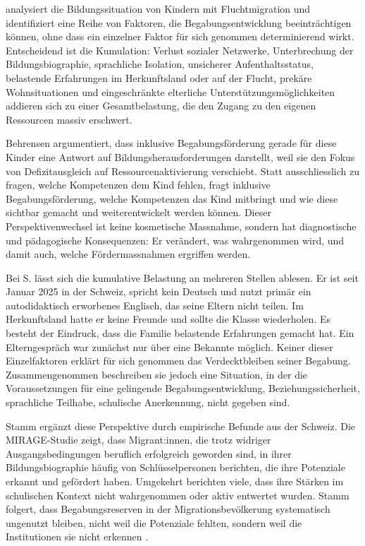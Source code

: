 \documentclass[ngerman, a4paper]{article}
\begin{document}
\textcite{behrensen2019inklusive} analysiert die Bildungssituation von Kindern mit Fluchtmigration und
identifiziert eine Reihe von Faktoren, die Begabungsentwicklung beeinträchtigen können,
ohne dass ein einzelner Faktor für sich genommen determinierend wirkt. Entscheidend
ist die Kumulation: Verlust sozialer Netzwerke, Unterbrechung der Bildungsbiographie,
sprachliche Isolation, unsicherer Aufenthaltsstatus, belastende Erfahrungen im
Herkunftsland oder auf der Flucht, prekäre Wohnsituationen und eingeschränkte
elterliche Unterstützungsmöglichkeiten addieren sich zu einer Gesamtbelastung, die
den Zugang zu den eigenen Ressourcen massiv erschwert.

Behrensen argumentiert, dass inklusive Begabungsförderung gerade für diese Kinder
eine Antwort auf Bildungsherausforderungen darstellt, weil sie den Fokus von
Defizitausgleich auf Ressourcenaktivierung verschiebt. Statt ausschliesslich zu fragen,
welche Kompetenzen dem Kind fehlen, fragt inklusive Begabungsförderung, welche
Kompetenzen das Kind mitbringt und wie diese sichtbar gemacht und weiterentwickelt
werden können. Dieser Perspektivenwechsel ist keine kosmetische Massnahme, sondern
hat diagnostische und pädagogische Konsequenzen: Er verändert, was wahrgenommen wird,
und damit auch, welche Fördermassnahmen ergriffen werden.

Bei S. lässt sich die kumulative Belastung an mehreren Stellen ablesen. Er ist seit
Januar 2025 in der Schweiz, spricht kein Deutsch und nutzt primär ein autodidaktisch
erworbenes Englisch, das seine Eltern nicht teilen. Im Herkunftsland hatte er keine
Freunde und sollte die Klasse wiederholen. Es besteht der Eindruck, dass die Familie
belastende Erfahrungen gemacht hat. Ein Elterngespräch war zunächst nur über eine
Bekannte möglich. Keiner dieser Einzelfaktoren erklärt für sich genommen das
Verdecktbleiben seiner Begabung. Zusammengenommen beschreiben sie jedoch eine Situation,
in der die Voraussetzungen für eine gelingende Begabungsentwicklung,
Beziehungssicherheit, sprachliche Teilhabe, schulische Anerkennung,
nicht gegeben sind.

Stamm ergänzt diese Perspektive durch empirische Befunde aus der Schweiz. Die
MIRAGE-Studie zeigt, dass Migrant:innen, die trotz widriger Ausgangsbedingungen
beruflich erfolgreich geworden sind, in ihrer Bildungsbiographie häufig von
Schlüsselpersonen berichten, die ihre Potenziale erkannt und gefördert haben. Umgekehrt
berichten viele, dass ihre Stärken im schulischen Kontext nicht wahrgenommen
oder aktiv entwertet wurden. Stamm folgert, dass Begabungsreserven in der
Migrationsbevölkerung systematisch ungenutzt bleiben, nicht weil die Potenziale
fehlten, sondern weil die Institutionen sie nicht erkennen
\parencite{stamm2014mirage}.
\end{document}
